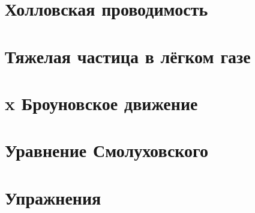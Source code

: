 
\setcounter{section}{9}
\section{Холловская проводимость}



\setcounter{section}{11}
\section{Тяжелая частица в лёгком газе}


% 

\setcounter{section}{13}
\section{x Броуновское движение}




\setcounter{section}{16}
\section{Уравнение Смолуховского}








\setcounter{section}{19}
\section{Упражнения}

